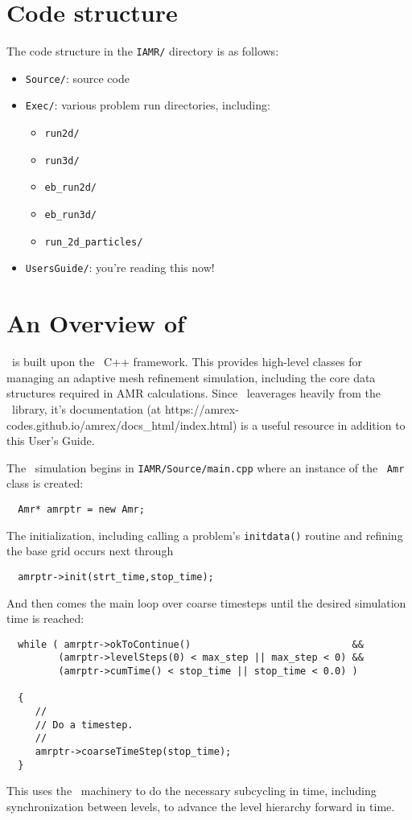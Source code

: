 \section{Code structure}

The code structure in the {\tt IAMR/} directory is as follows:
\begin{itemize}

\item {\tt Source/}: source code

\item {\tt Exec/}: various problem run directories, including:
  \begin{itemize}
  \item {\tt run2d/}
  \item {\tt run3d/}
  \item {\tt eb\_run2d/}
  \item {\tt eb\_run3d/}
  \item {\tt run\_2d\_particles/}
  \end{itemize}

\item {\tt UsersGuide/}: you're reading this now!

\end{itemize}


\section{An Overview of \iamr}

\iamr\ is built upon the \amrex\ C++ framework.  This provides
high-level classes for managing an adaptive mesh refinement simulation,
including the core data structures required in AMR calculations.
Since \iamr\ leaverages heavily from the \amrex\ library,
it's documentation (at https://amrex-codes.github.io/amrex/docs\_html/index.html)
is a useful resource in addition to this User's Guide.

The \iamr\ simulation begins in {\tt IAMR/Source/main.cpp} where an instance
of the \amrex\ {\tt Amr} class is created:
\begin{lstlisting}
  Amr* amrptr = new Amr;
\end{lstlisting}
The initialization, including calling a problem's {\tt initdata()}
routine and refining the base grid occurs next through
\begin{lstlisting}
  amrptr->init(strt_time,stop_time);
\end{lstlisting}
And then comes the main loop over coarse timesteps until the
desired simulation time is reached:
\begin{lstlisting}
  while ( amrptr->okToContinue()                            &&
         (amrptr->levelSteps(0) < max_step || max_step < 0) &&
         (amrptr->cumTime() < stop_time || stop_time < 0.0) )

  {
     //
     // Do a timestep.
     //
     amrptr->coarseTimeStep(stop_time);
  }
\end{lstlisting}
This uses the \amrex\ machinery to do the necessary subcycling in time,
including synchronization between levels, to advance the level hierarchy
forward in time.  

